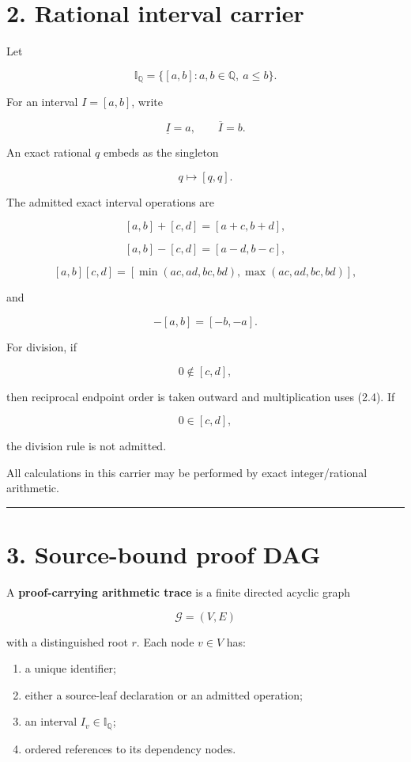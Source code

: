 \hypertarget{rational-interval-carrier}{%
\section{2. Rational interval carrier}\label{rational-interval-carrier}}

Let

\[
\mathbb I_{\mathbb Q}
=
\{[a,b]:a,b\in\mathbb Q,\ a\le b\}.
\]

For an interval \(I=[a,b]\), write

\[
\underline I=a,
\qquad
\overline I=b.
\]

An exact rational \(q\) embeds as the singleton

\[
\boxed{q\mapsto[q,q].}
\tag{2.1}
\]

The admitted exact interval operations are

\[
[a,b]+[c,d]=[a+c,b+d],
\tag{2.2}
\]

\[
[a,b]-[c,d]=[a-d,b-c],
\tag{2.3}
\]

\[
[a,b][c,d]
=
[\min(ac,ad,bc,bd),\max(ac,ad,bc,bd)],
\tag{2.4}
\]

and

\[
-[a,b]=[-b,-a].
\tag{2.5}
\]

For division, if

\[
0\notin[c,d],
\tag{2.6}
\]

then reciprocal endpoint order is taken outward and multiplication uses (2.4). If

\[
0\in[c,d],
\]

the division rule is not admitted.

All calculations in this carrier may be performed by exact integer/rational arithmetic.

\begin{center}\rule{0.5\linewidth}{0.5pt}\end{center}

\hypertarget{source-bound-proof-dag}{%
\section{3. Source-bound proof DAG}\label{source-bound-proof-dag}}

A \textbf{proof-carrying arithmetic trace} is a finite directed acyclic graph

\[
\mathcal G=(V,E)
\]

with a distinguished root \(r\). Each node \(v\in V\) has:

\begin{enumerate}
\def\labelenumi{\arabic{enumi}.}
\tightlist
\item
  a unique identifier;
\item
  either a source-leaf declaration or an admitted operation;
\item
  an interval \(I_v\in\mathbb I_{\mathbb Q}\);
\item
  ordered references to its dependency nodes.
\end{enumerate}

